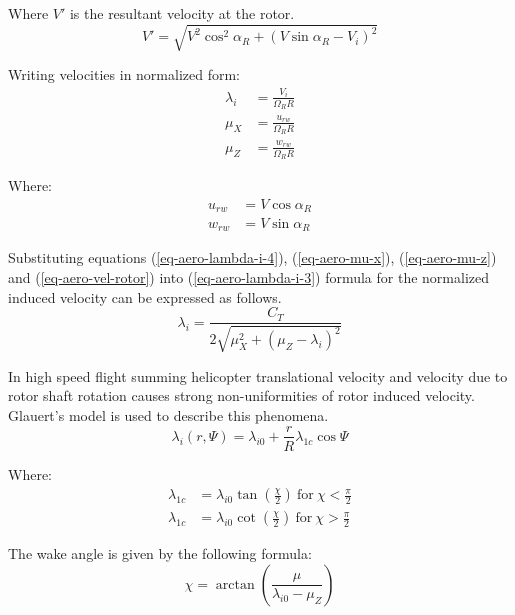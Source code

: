 Where $V'$ is the resultant velocity at the rotor.
\begin{equation}
  \label{eq-aero-vel-rotor}
  V' = \sqrt{
    V^2 \cos^2 \alpha_R
    + \left( V \sin \alpha_R - V_i \right)^2
  }
\end{equation}

Writing velocities in normalized form:
\begin{align}
  \label{eq-aero-lambda-i-4}
  \lambda_i &= \frac{V_i}    { \Omega_R R } \\
  \label{eq-aero-mu-x}
  \mu_X     &= \frac{u_{rw}} { \Omega_R R } \\
  \label{eq-aero-mu-z}
  \mu_Z     &= \frac{w_{rw}} { \Omega_R R }
\end{align}

Where:
\begin{align}
  u_{rw} &= V \cos \alpha_R \\
  w_{rw} &= V \sin \alpha_R
\end{align}

Substituting equations (\ref{eq-aero-lambda-i-4}), (\ref{eq-aero-mu-x}), (\ref{eq-aero-mu-z}) and (\ref{eq-aero-vel-rotor}) into (\ref{eq-aero-lambda-i-3}) formula for the normalized induced velocity can be expressed as follows.
\begin{equation}
  \label{eq-aero-lambda-i-5}
  \lambda_i
  =
  \frac{C_T}{ 2 \sqrt{ \mu_X^2 + \left( \mu_Z - \lambda_i \right)^2 } }
\end{equation}

In high speed flight summing helicopter translational velocity and velocity due to rotor shaft rotation causes strong non-uniformities of rotor induced velocity. Glauert’s model is used to describe this phenomena. \cite{Padfield2007, Bramwell2001}
\begin{equation}
  \lambda_i \left( r, \Psi \right)
  =
  \lambda_{i0} + \frac{r}{R} \lambda_{1c} \cos \Psi
\end{equation}

Where:
\begin{align}
  \lambda_{1c} &= \lambda_{i0} \tan \left( \frac{\chi}{2} \right)
  \mathrm{~for~} \chi < \frac{\pi}{2} \\
  \lambda_{1c} &= \lambda_{i0} \cot \left( \frac{\chi}{2} \right)
  \mathrm{~for~} \chi > \frac{\pi}{2}
\end{align}

The wake angle is given by the following formula:
\begin{equation}
  \chi = \arctan \left( \frac{\mu}{ \lambda_{i0} - \mu_Z } \right)
\end{equation}

